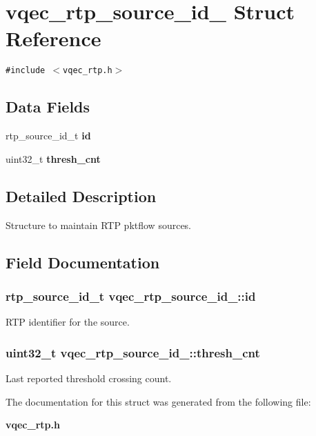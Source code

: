 \section{vqec\_\-rtp\_\-source\_\-id\_\- Struct Reference}
\label{structvqec__rtp__source__id__}
{\tt \#include $<$vqec\_\-rtp.h$>$}

\subsection*{Data Fields}
\begin{CompactItemize}
\item 
rtp\_\-source\_\-id\_\-t \bf{id}
\item 
uint32\_\-t \bf{thresh\_\-cnt}
\end{CompactItemize}


\subsection{Detailed Description}
Structure to maintain RTP pktflow sources. 



\subsection{Field Documentation}
\subsubsection{\setlength{\rightskip}{0pt plus 5cm}rtp\_\-source\_\-id\_\-t \bf{vqec\_\-rtp\_\-source\_\-id\_\-::id}}\label{structvqec__rtp__source__id___ad038bf0e1d2bae6057ca0d19a142c49}


RTP identifier for the source. 
\subsubsection{\setlength{\rightskip}{0pt plus 5cm}uint32\_\-t \bf{vqec\_\-rtp\_\-source\_\-id\_\-::thresh\_\-cnt}}\label{structvqec__rtp__source__id___8e9bc106b046ecbd4af9306850cba86f}


Last reported threshold crossing count. 

The documentation for this struct was generated from the following file:\begin{CompactItemize}
\item 
\bf{vqec\_\-rtp.h}\end{CompactItemize}
